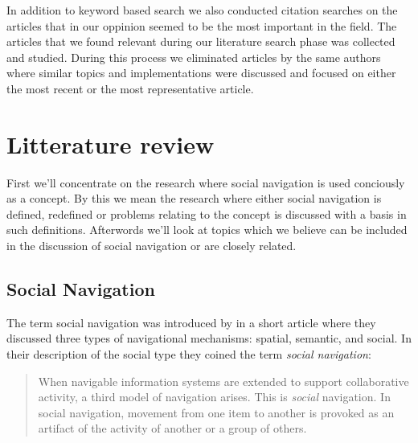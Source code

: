 
In addition to keyword based search we also conducted citation searches on the
articles that in our oppinion seemed to be the most important in the field.
The articles that we found relevant during our literature search phase was
collected and studied. During this process we eliminated articles by the same
authors where similar topics and implementations were discussed and focused on
either the most recent or the most representative article.

\section{Litterature review}

First we'll concentrate on the research where social navigation is used
conciously as a concept. By this we mean the research where either social
navigation is defined, redefined or problems relating to the concept is
discussed with a basis in such definitions. Afterwords we'll look at topics
which we believe can be included in the discussion of social navigation or are
closely related.

\subsection{Social Navigation}
\label{section:background.social.navigation}

The term social navigation was introduced by \citet{dourish94} in a short
article where they discussed three types of navigational mechanisms: spatial,
semantic, and social. In their description of the social type they coined the
term \emph{social navigation}:

\begin{quote}
  When navigable information systems are extended to support collaborative
  activity, a third model of navigation arises. This is \emph{social}
  navigation. In social navigation, movement from one item to another is
  provoked as an artifact of the activity of another or a group of others.
  \citep{dourish94}
\end{quote}

